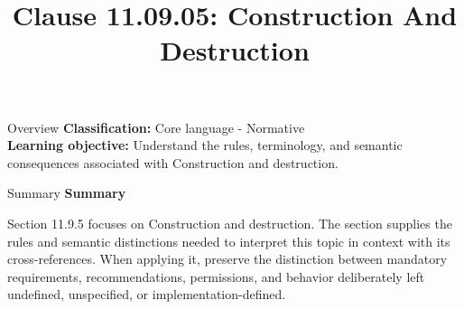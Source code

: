 \documentclass[10pt,letterpaper]{article}
\title{Clause 11.09.05: Construction And Destruction}
\author{}
\date{}
\begin{document}
\maketitle
\begin{CornellOverviewBox}{Overview}
\textbf{Classification:} Core language - Normative\\[2pt]
\textbf{Learning objective:} Understand the rules, terminology, and semantic consequences associated with Construction and destruction.
\end{CornellOverviewBox}\begin{CornellSummaryBox}{Summary}
{\sffamily\bfseries\color{Accent} Summary}\par\vspace{3pt}Section 11.9.5 focuses on Construction and destruction. The section supplies the rules and semantic distinctions needed to interpret this topic in context with its cross-references. When applying it, preserve the distinction between mandatory requirements, recommendations, permissions, and behavior deliberately left undefined, unspecified, or implementation-defined.
\end{CornellSummaryBox}
\end{document}
